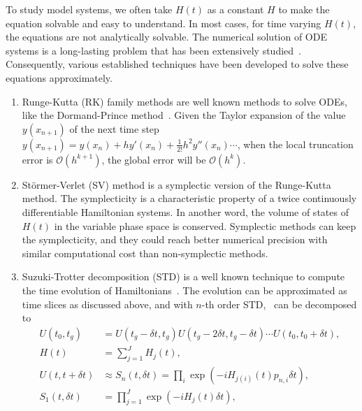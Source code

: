 \documentclass[a4paper,onecolumn,11pt,unpublished]{quantumarticle}
\begin{document}
To study model systems, we often take $H(t)$ as a constant $H$ to make the equation solvable and easy to understand. In most cases, for time varying $H(t)$, the equations are not analytically solvable. The numerical solution of ODE systems is a long-lasting problem that has been extensively studied~\cite{Hairer1993Solving,Hairer1996Solving,Hairer2006Geometric,DAmbrosio2023Numerical}. Consequently, various established techniques have been developed to solve these equations approximately.
\begin{enumerate}
  \item Runge-Kutta (RK) family methods are well known methods to solve ODEs, like the Dormand-Prince method~\cite{Dormand1980A}. Given the Taylor expansion of the value $y(x_{n+1})$ of the next time step $y(x_{n+1})=y(x_n)+hy'(x_n)+\frac{1}{2!}h^2y''(x_n)\cdots$, when the local truncation error is $\mathcal{O}(h^{k+1})$, the global error will be $\mathcal{O}(h^k)$.
  \item Störmer-Verlet (SV) method is a symplectic version of the Runge-Kutta method. The symplecticity is a characteristic property of a twice continuously differentiable Hamiltonian systems. In another word, the volume of states of $H(t)$ in the variable phase space is conserved. Symplectic methods can keep the symplecticity, and they could reach better numerical precision with similar computational cost than non-symplectic methods.
  \item Suzuki-Trotter decomposition (STD) is a well known technique to compute the time evolution of Hamiltonians~\cite{Trotter1959On,Suzuki1976Generalized,Suzuki1976Relationship}. The evolution can be approximated as time slices as discussed above, and with $n$-th order STD,~ can be decomposed to
        \begin{align}
          U(t_0,t_g)       & = U(t_g - \delta t, t_g) U(t_g-2\delta t, t_g-\delta t)\cdots U(t_0, t_0+\delta t), \label{eq:u_time_split}              \\
          H(t)             & = \sum_{j=1}^J H_j(t), \label{eq:local_hamiltonian}                                                                      \\
          U(t, t+\delta t) & \approx S_n(t, \delta t) = \prod_i \exp(-i H_{j(i)}(t) p_{n,i} \delta t), \label{eq:std_terms}                           \\
          S_1(t, \delta t) & = \prod_{j=1}^J \exp(-i H_j(t)\delta t), \label{eq:trotter_1}                                                            \\

\end{align}
\end{enumerate}
\end{document}
